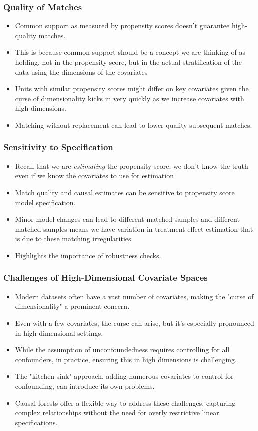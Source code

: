 \documentclass{beamer}
\begin{document}
\begin{frame}
\frametitle{Quality of Matches}
\begin{itemize}
    \item Common support as measured by propensity scores doesn't guarantee high-quality matches.
    \item This is because common support should be a concept we are thinking of as holding, not in the propensity score, but in the actual stratification of the data using the dimensions of the covariates
    \item Units with similar propensity scores might differ on key covariates given the curse of dimensionality kicks in very quickly as we increase covariates with high dimensions.
    \item Matching without replacement can lead to lower-quality subsequent matches.
\end{itemize}
\end{frame}

\begin{frame}
\frametitle{Sensitivity to Specification}
\begin{itemize}
	\item Recall that we are \emph{estimating} the propensity score; we don't know the truth even if we know the covariates to use for estimation
    \item Match quality and causal estimates can be sensitive to propensity score model specification.
    \item Minor model changes can lead to different matched samples and different matched samples means we have variation in treatment effect estimation that is due to these matching irregularities
    \item Highlights the importance of robustness checks.
\end{itemize}
\end{frame}

\begin{frame}
\frametitle{Challenges of High-Dimensional Covariate Spaces}
\begin{itemize}
    \item Modern datasets often have a vast number of covariates, making the "curse of dimensionality" a prominent concern.
    \item Even with a few covariates, the curse can arise, but it's especially pronounced in high-dimensional settings.
    \item While the assumption of unconfoundedness requires controlling for all confounders, in practice, ensuring this in high dimensions is challenging.
    \item The "kitchen sink" approach, adding numerous covariates to control for confounding, can introduce its own problems.
    \item Causal forests offer a flexible way to address these challenges, capturing complex relationships without the need for overly restrictive linear specifications.
\end{itemize}
\end{frame}
\end{document}
